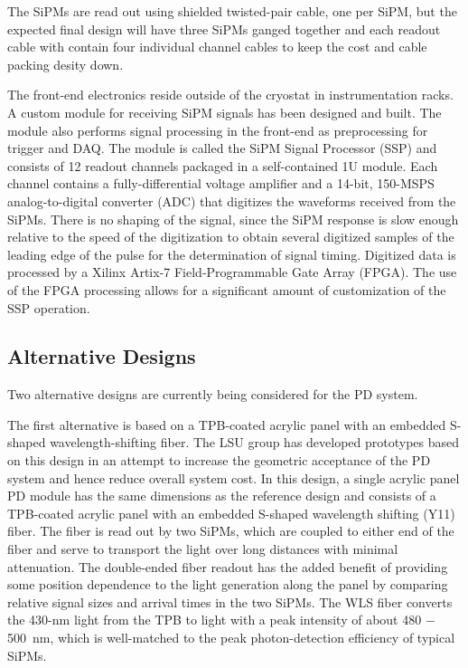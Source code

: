 The SiPMs are read out using shielded twisted-pair cable, one per SiPM,
but the expected final design will have three SiPMs ganged together and
each readout cable with contain four individual channel cables to keep
the cost and cable packing desity down.   

The front-end electronics reside outside of the cryostat in
instrumentation racks. A custom module for receiving SiPM signals has
been designed and built. The module also performs signal processing in
the front-end as preprocessing for trigger and DAQ.  The module is
called the SiPM Signal Processor (SSP) and consists of 12 readout
channels packaged in a self-contained 1U module.  Each channel
contains a fully-differential voltage amplifier and a 14-bit, 150-MSPS
analog-to-digital converter (ADC) that digitizes the waveforms
received from the SiPMs. There is no shaping of the signal, since the
SiPM response is slow enough relative to the speed of the digitization
to obtain several digitized samples of the leading edge of the pulse
for the determination of signal timing. Digitized data is processed by
a Xilinx Artix-7 Field-Programmable Gate Array (FPGA).  The use of the
FPGA processing allows for a significant amount of customization of
the SSP operation. 

\subsection{Alternative Designs} 

Two alternative designs are currently being considered for the PD
system. 

The first alternative is based on a TPB-coated acrylic
panel with an embedded S-shaped wavelength-shifting fiber. The LSU
group has developed prototypes based on this design in an attempt to
increase the geometric acceptance of the PD system and hence reduce
overall system cost. 
%
In this design, a single acrylic panel PD module has the same dimensions as the
reference design and consists of a TPB-coated acrylic panel with an
embedded S-shaped wavelength shifting (Y11) fiber. The fiber is read
out by two SiPMs, which are coupled to either end of the fiber and
serve to transport the light over long distances with minimal
attenuation. The double-ended fiber readout has the added benefit of
providing some position dependence to the light generation along the
panel by comparing relative signal sizes and arrival times in the two
SiPMs. The WLS fiber converts the 430-nm light from the TPB to light
with a peak intensity of about 480 $-$ 500~nm, which is well-matched to
the peak photon-detection efficiency of typical SiPMs.

